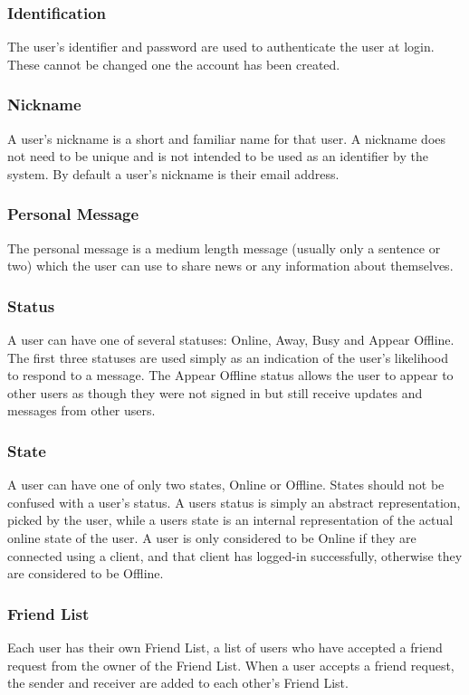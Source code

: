 \subsubsection{Identification}
The user's identifier and password are used to authenticate the user at login. These cannot be changed one the account has been created. 


\subsubsection{Nickname}
A user's nickname is a short and familiar name for that user. A nickname does not need to be unique and is not intended to be used as an identifier by the system. By default a user's nickname is their email address.


\subsubsection{Personal Message}
The personal message is a medium length message (usually only a sentence or two) which the user can use to share news or any information about themselves.


\subsubsection{Status}
A user can have one of several statuses: Online, Away, Busy and Appear Offline. The first three statuses are used simply as an indication of the user's likelihood to respond to a message. The Appear Offline status allows the user to appear to other users as though they were not signed in but still receive updates and messages from other users.

\subsubsection{State}
A user can have one of only two states, Online or Offline. States should not be confused with a user's status. A users status is simply an abstract representation, picked by the user, while a users state is an internal representation of the actual online state of the user. A user is only considered to be Online if they are connected using a client, and that client has logged-in successfully, otherwise they are considered to be Offline.

\subsubsection{Friend List}
Each user has their own Friend List, a list of users who have accepted a friend request from the owner of the Friend List. When a user accepts a friend request, the sender and receiver are added to each other's Friend List.


